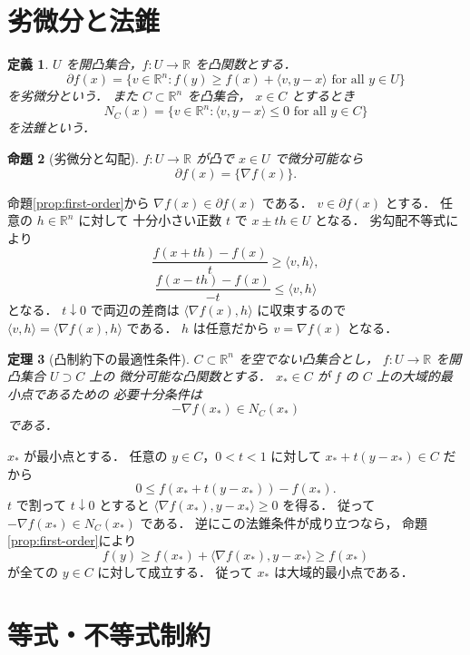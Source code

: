 \documentclass[a5paper,10pt,onecolumn]{jsarticle}
\makeatletter
\theoremstyle{mathnotetheorem}
\newtheorem{theorem}{定理}[section]
\newtheorem{definition}[theorem]{定義}
\newtheorem{proposition}[theorem]{命題}
\renewcommand{\proofname}{証明}
\renewenvironment{proof}[1][\proofname]{%
  \par\pushQED{\qed}\normalfont\topsep4\p@\@plus2\p@\relax
  \trivlist\item[\hskip\labelsep\bfseries #1]\ignorespaces
}{\popQED\endtrivlist\@endpefalse}
\makeatother
\begin{document}
\section{劣微分と法錐}

\begin{definition}
$U$ を開凸集合，$f:U\to\mathbb R$ を凸関数とする．
\[
 \partial f(x)=
 \{v\in\mathbb R^n:
 f(y)\ge f(x)+\langle v,y-x\rangle
 \text{ for all }y\in U\}
\]
を\emph{劣微分}という．
また $C\subset\mathbb R^n$ を凸集合，
$x\in C$ とするとき
\[
 N_C(x)=
 \{v\in\mathbb R^n:
 \langle v,y-x\rangle\le0
 \text{ for all }y\in C\}
\]
を\emph{法錐}という．
\end{definition}

\begin{proposition}[劣微分と勾配]\label{prop:grad-subdiff}
$f:U\to\mathbb R$ が凸で $x\in U$ で微分可能なら
\[
 \partial f(x)=\{\nabla f(x)\}.
\]
\end{proposition}
\begin{proof}
命題\ref{prop:first-order}から
$\nabla f(x)\in\partial f(x)$ である．
$v\in\partial f(x)$ とする．
任意の $h\in\mathbb R^n$ に対して
十分小さい正数 $t$ で $x\pm th\in U$ となる．
劣勾配不等式により
\[
 \frac{f(x+th)-f(x)}t\ge\langle v,h\rangle,
\]
\[
 \frac{f(x-th)-f(x)}{-t}\le\langle v,h\rangle
\]
となる．
$t\downarrow0$ で両辺の差商は
$\langle\nabla f(x),h\rangle$ に収束するので
$\langle v,h\rangle=\langle\nabla f(x),h\rangle$ である．
$h$ は任意だから $v=\nabla f(x)$ となる．
\end{proof}

\begin{theorem}[凸制約下の最適性条件]\label{thm:normal}
$C\subset\mathbb R^n$ を空でない凸集合とし，
$f:U\to\mathbb R$ を開凸集合 $U\supset C$ 上の
微分可能な凸関数とする．
$x_*\in C$ が $f$ の $C$ 上の大域的最小点であるための
必要十分条件は
\[
 -\nabla f(x_*)\in N_C(x_*)
\]
である．
\end{theorem}
\begin{proof}
$x_*$ が最小点とする．
任意の $y\in C$，$0<t<1$ に対して
$x_*+t(y-x_*)\in C$ だから
\[
 0\le f(x_*+t(y-x_*))-f(x_*).
\]
$t$ で割って $t\downarrow0$ とすると
$\langle\nabla f(x_*),y-x_*\rangle\ge0$ を得る．
従って $-\nabla f(x_*)\in N_C(x_*)$ である．
逆にこの法錐条件が成り立つなら，
命題\ref{prop:first-order}により
\[
 f(y)\ge f(x_*)+
 \langle\nabla f(x_*),y-x_*\rangle
 \ge f(x_*)
\]
が全ての $y\in C$ に対して成立する．
従って $x_*$ は大域的最小点である．
\end{proof}

\section{等式・不等式制約}
\end{document}
